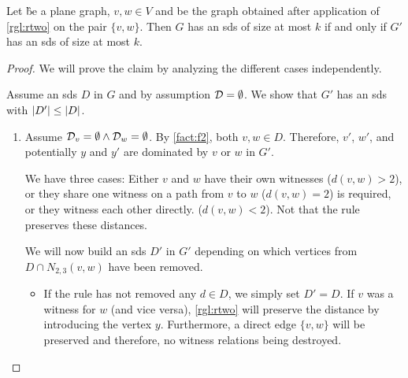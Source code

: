 \begin{lemma}\label{lemma:correctnesstwo}
    Let \G be a plane graph, $v, w \in V$ and \GB be the graph obtained after application of \cref{rgl:rtwo} on the pair $\{v, w\}$. Then $G$ has an sds of size at most $k$ if and only if $G'$ has an sds of size at most $k$.
\end{lemma}
\begin{proof}

We will prove the claim by analyzing the different cases independently.     

Assume an sds $D$ in $G$ and by assumption $\mathcal{D} = \emptyset$. 
We show that $G'$ has an sds with $\abs{D'} \leq \abs{D}$. 
    \begin{enumerate}
        \item Assume $ \mathcal{D}_{v} = \emptyset  \wedge \mathcal{D}_{w} = \emptyset $. By \cref{fact:f2}, both $v, w \in D$.
        Therefore, $v'$, $w'$, and potentially $y$ and $y'$ are dominated by $v$ or $w$ in $G'$.
        
        We have three cases: Either $v$ and $w$ have their own witnesses ($d(v,w) > 2$), or they share one witness on a path from $v$ to $w$ ($d(v,w)= 2$) is required, or they witness each other directly. ($d(v,w) <2$).
        Not that the rule preserves these distances.

        We will now build an sds $D'$ in $G'$ depending on which vertices from $D \cap N_{2,3}(v,w)$ have been removed. 

        \begin{itemize}
            \item If the rule has not removed any $d \in D$, we simply set $D' = D$. 
            If $v$ was a witness for $w$ (and vice versa), \cref{rgl:rtwo} will preserve the distance by introducing the vertex $y$. 
            Furthermore, a direct edge $\{v,w\}$ will be preserved and therefore, no witness relations being destroyed.


\end{itemize}
\end{enumerate}
\end{proof}
